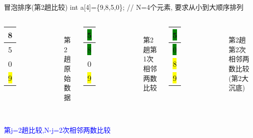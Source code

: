 \begin{frame}{冒泡排序(第2趟比较)}
int a[4]=\{9,8,5,0\}; // N=4个元素, 要求从小到大顺序排列
\begin{columns}[T]
	\begin{tabular}{|c|}
		\hline 
		8 \\ 
		\hline 
		5 \\ 
		\hline 
		0 \\ 
		\hline
		\colorbox{yellow}{9} \\
		\hline 
	\end{tabular}\\ 
	第2趟原始数据
	\pause
	\begin{tabular}{|c|}
		\hline 
		\colorbox{green}{5} \\ 
		\hline 
		\colorbox{green}{8} \\ 
		\hline 
		0 \\ 
		\hline
		\colorbox{yellow}{9} \\
		\hline  
	\end{tabular}\\ 
	第2趟第1次相邻两数比较
	\pause
	\begin{tabular}{|c|}
		\hline 
		\colorbox{green}{5} \\ 
		\hline 
		\colorbox{green}{0} \\ 
		\hline 
		\colorbox{yellow}{8} \\ 
		\hline 
		\colorbox{yellow}{9} \\
		\hline 
	\end{tabular}\\ 
	第2趟第2次相邻两数比较(第2大沉底)
\end{columns}
~\\
\textcolor{blue}{第j=2趟比较,N-j=2次相邻两数比较}
\end{frame}

